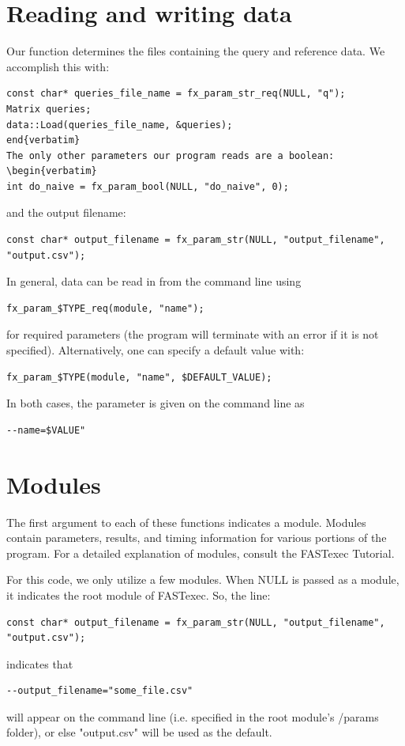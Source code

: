 \documentclass[letter]{report}
\begin{document}
\section {Reading and writing data} 
Our function determines the files containing the query and reference data. We accomplish this with: 
\begin{verbatim}
const char* queries_file_name = fx_param_str_req(NULL, "q");
Matrix queries; 
data::Load(queries_file_name, &queries);
end{verbatim}
The only other parameters our program reads are a boolean: 
\begin{verbatim}
int do_naive = fx_param_bool(NULL, "do_naive", 0);
\end{verbatim}
and the output filename: 
\begin{verbatim}
const char* output_filename = fx_param_str(NULL, "output_filename", "output.csv");
\end{verbatim}
In general, data can be read in from the command line using 
\begin{verbatim}
fx_param_$TYPE_req(module, "name");
\end{verbatim}
for required parameters (the program will terminate with an error if it is not specified). Alternatively, one can specify a default value with: 
\begin{verbatim}
fx_param_$TYPE(module, "name", $DEFAULT_VALUE);
\end{verbatim}
In both cases, the parameter is given on the command line as 
\begin{verbatim}
--name=$VALUE"
\end{verbatim}

\section{Modules} 
The first argument to each of these functions indicates a module. Modules contain parameters, results, and timing information for various portions of the program. For a detailed explanation of modules, consult the FASTexec Tutorial. 

For this code, we only utilize a few modules. When NULL is passed as a module, it indicates the root module of FASTexec. So, the line: 
\begin{verbatim}
const char* output_filename = fx_param_str(NULL, "output_filename", "output.csv");
\end{verbatim}
indicates that \begin{verbatim}--output_filename="some_file.csv"\end{verbatim} will appear on the command line (i.e. specified in the root module's /params folder), or else "output.csv" will be used as the default. 
\end{document}

